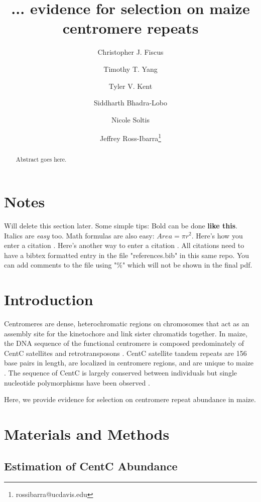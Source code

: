 \documentclass[12pt]{article}
\title{... evidence for selection on maize centromere repeats}
\author[1]{Christopher J. Fiscus}
\author[1]{Timothy T. Yang}
\author[1]{Tyler V. Kent}
\author[1]{Siddharth Bhadra-Lobo}
\author[1]{Nicole Soltis}
\author[1,2]{Jeffrey Ross-Ibarra\thanks{rossibarra@ucdavis.edu}}
\affil[1]{Department of Plant Sciences, University of California Davis}
\affil[2]{Center for Population Biology and Genome Center, University of California Davis}
\date{}
\begin{document}
\maketitle

\begin{abstract}
Abstract goes here.
\end{abstract}

\begin{footnotesize}
\end{footnotesize}

\section*{Notes}

Will delete this section later.  Some simple tips:
Bold can be done {\bf like this}.  Italics are \emph{easy} too.  Math formulas are also easy: $Area=\pi r^2$.
Here's how you enter a citation \cite{Wolfgruber2009}.
Here's another way to enter a citation \citep{Wolfgruber2009}.
All citations need to have a bibtex formatted entry in the file "references.bib" in this same repo. You can add comments to the file using "\%" which will not be shown in the final pdf.  

\section{Introduction}
Centromeres are dense, heterochromatic regions on chromosomes that act as an assembly site for the kinetochore and link sister chromatids together.  In maize, the DNA sequence of the functional centromere is composed predominately of CentC satellites and retrotransposons \cite{Nagaki2003}.  CentC satellite tandem repeats are 156 base pairs in length, are localized in centromere regions, and are unique to maize \cite{Ananiev1998}.  The sequence of CentC is largely conserved between individuals but single nucleotide polymorphisms have been observed \cite{Ananiev1998}.  

Here, we provide evidence for selection on centromere repeat abundance in maize. 

\section{Materials and Methods}

\subsection{Estimation of CentC Abundance} %
\end{document}

